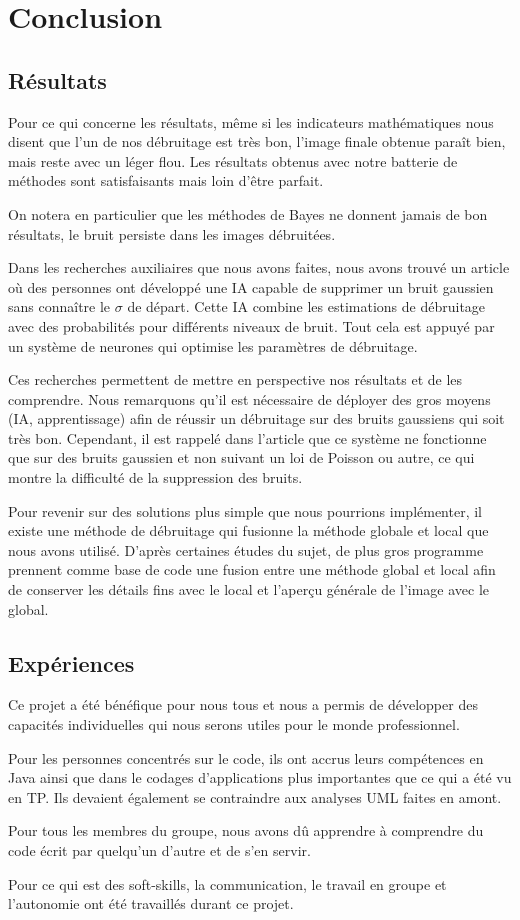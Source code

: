 \section{Conclusion}
\subsection{Résultats}
Pour ce qui concerne les résultats, même si les indicateurs mathématiques nous disent que l'un de nos débruitage est très bon, l'image finale obtenue paraît bien, mais reste avec un léger flou. Les résultats obtenus avec notre batterie de méthodes sont satisfaisants mais loin d'être parfait.\par
On notera en particulier que les méthodes de Bayes ne donnent jamais de bon résultats, le bruit persiste dans les images débruitées. \par
Dans les recherches auxiliaires que nous avons faites, nous avons trouvé un article où des personnes ont développé une IA capable de supprimer un bruit gaussien sans connaître le \(\sigma\) de départ. Cette IA combine les estimations de débruitage avec des probabilités pour différents niveaux de bruit. Tout cela est appuyé par un système de neurones qui optimise les paramètres de débruitage. \par
Ces recherches permettent de mettre en perspective nos résultats et de les comprendre. Nous remarquons qu'il est nécessaire de déployer des gros moyens (IA, apprentissage) afin de réussir un débruitage sur des bruits gaussiens qui soit très bon. Cependant, il est rappelé dans l'article que ce système ne fonctionne que sur des bruits gaussien et non suivant un loi de Poisson ou autre, ce qui montre la difficulté de la suppression des bruits. \par
Pour revenir sur des solutions plus simple que nous pourrions implémenter, il existe une méthode de débruitage qui fusionne la méthode globale et local que nous avons utilisé. D'après certaines études du sujet, de plus gros programme prennent comme base de code une fusion entre une méthode global et local afin de conserver les détails fins avec le local et l’aperçu générale de l'image avec le global.

\subsection{Expériences}
Ce projet a été bénéfique pour nous tous et nous a permis de développer des capacités individuelles qui nous serons utiles pour le monde professionnel.\par
Pour les personnes concentrés sur le code, ils ont accrus leurs compétences en Java ainsi que dans le codages d'applications plus importantes que ce qui a été vu en TP. Ils devaient également se contraindre aux analyses UML faites en amont. \par
Pour tous les membres du groupe, nous avons dû apprendre à comprendre du code écrit par quelqu'un d'autre et de s'en servir.\par
Pour ce qui est des soft-skills, la communication, le travail en groupe et l'autonomie ont été travaillés durant ce projet.

